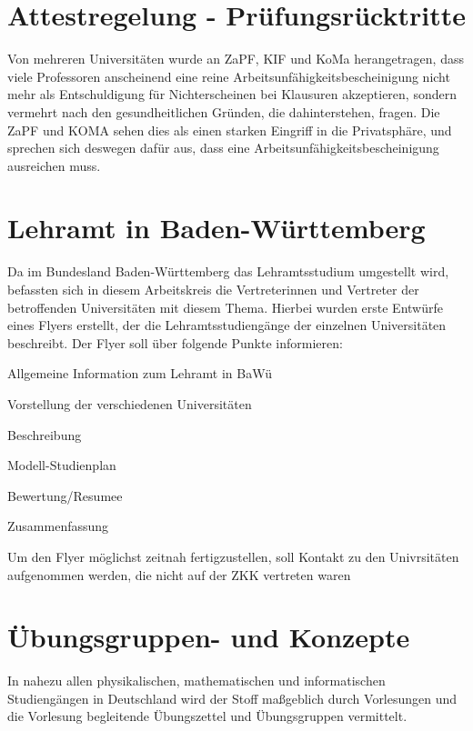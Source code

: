 \documentclass{scrartcl}
\begin{document}
\section*{Attestregelung - Prüfungsrücktritte}

Von mehreren Universitäten wurde an ZaPF, KIF und KoMa herangetragen, dass
viele Professoren anscheinend eine reine Arbeitsunfähigkeitsbescheinigung nicht mehr als
Entschuldigung für Nichterscheinen bei Klausuren akzeptieren,
sondern vermehrt nach den gesundheitlichen Gründen, die dahinterstehen, fragen.
Die ZaPF und KOMA sehen dies als einen starken Eingriff in die Privatsphäre, und
sprechen sich deswegen dafür aus, dass eine Arbeitsunfähigkeitsbescheinigung
ausreichen muss.

\section*{Lehramt in Baden-Württemberg}

Da im Bundesland Baden-Württemberg das Lehramtsstudium umgestellt wird,
befassten sich in diesem Arbeitskreis die Vertreterinnen und Vertreter der
betroffenden Universitäten mit diesem Thema. Hierbei wurden erste Entwürfe
eines Flyers erstellt, der die Lehramtsstudiengänge der einzelnen Universitäten
beschreibt. Der Flyer soll über folgende Punkte informieren:

\begin{compactenum}
    \item Allgemeine Information zum Lehramt in BaWü
    \item Vorstellung der verschiedenen Universitäten
        \begin{compactenum}
        \item Beschreibung
        \item Modell-Studienplan
        \item Bewertung/Resumee
        \end{compactenum}
    \item Zusammenfassung
\end{compactenum}

Um den Flyer möglichst zeitnah fertigzustellen, soll Kontakt zu den Univrsitäten aufgenommen werden, die nicht auf der ZKK vertreten waren

\newpage
\section*{Übungsgruppen- und Konzepte}
In nahezu allen physikalischen, mathematischen und informatischen Studiengängen
in Deutschland wird der Stoff maßgeblich durch Vorlesungen und die Vorlesung
begleitende Übungszettel und Übungsgruppen vermittelt.
\end{document}

